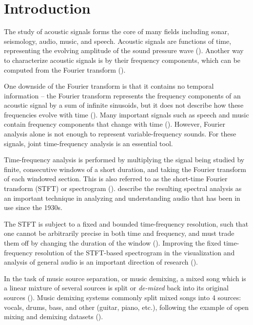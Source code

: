 \documentclass[report.tex]{subfiles}
\begin{document}
\section{Introduction}
\label{sec:intro}

The study of acoustic signals forms the core of many fields including sonar, seismology, audio, music, and speech. Acoustic signals are functions of time, representing the evolving amplitude of the sound pressure wave (\cite[Chapter~4]{melbook}). Another way to characterize acoustic signals is by their frequency components, which can be computed from the Fourier transform (\cite[Chapter~2]{melbook}).

One downside of the Fourier transform is that it contains no temporal information -- the Fourier transform represents the frequency components of an acoustic signal by a sum of infinite sinusoids, but it does not describe how these frequencies evolve with time (\cite{gabordiagrams}). Many important signals such as speech and music contain frequency components that change with time (\cite{gabor1946}). However, Fourier analysis alone is not enough to represent variable-frequency sounds. For these signals, joint time-frequency analysis is an essential tool.

Time-frequency analysis is performed by multiplying the signal being studied by finite, consecutive windows of a short duration, and taking the Fourier transform of each windowed section. This is also referred to as the short-time Fourier transform (STFT) or spectrogram (\cite[Chapter~3]{melbook}). \textcite{melbook} describe the resulting spectral analysis as an important technique in analyzing and understanding audio that has been in use since the 1930s.

The STFT is subject to a fixed and bounded time-frequency resolution, such that one cannot be arbitrarily precise in both time and frequency, and must trade them off by changing the duration of the window (\cite{gabor1946, gabordiagrams}). Improving the fixed time-frequency resolution of the STFT-based spectrogram in the visualization and analysis of general audio is an important direction of research (\cite{bettertfres1, bettertfres2}).

In the task of music source separation, or music demixing, a mixed song which is a linear mixture of several sources is split or \textit{de-mixed} back into its original sources (\cite{musicsepgood, musicsepsurvey}). Music demixing systems commonly split mixed songs into 4 sources: vocals, drums, bass, and other (guitar, piano, etc.), following the example of open mixing and demixing datasets (\cite{otherdataset1, otherdataset2, musdb18, musdb18hq}).
\end{document}
